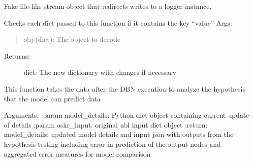 \documentclass[letterpaper,10pt,english]{sphinxmanual}
\begin{document}

\begin{fulllineitems}
\label{\detokenize{index:dbnrisk_wrapper_aske.StreamToLogger}}
Fake file-like stream object that redirects writes to a logger instance.

\end{fulllineitems}


\begin{fulllineitems}
\label{\detokenize{index:dbnrisk_wrapper_aske.as_float}}
Checks each dict passed to this function if it contains the key “value”
Args:
\begin{quote}

obj (dict): The object to decode
\end{quote}
\begin{description}
\item[{Returns:}] \leavevmode
dict: The new dictionary with changes if necessary

\end{description}

\end{fulllineitems}


\begin{fulllineitems}
\label{\detokenize{index:dbnrisk_wrapper_aske.postProcessHypothesis}}
This function takes the data after the DBN execution to analyze the hypothesis that the model can predict data

Arguments:
:param model\_details: Python dict object containing current update of details
:param aske\_input: original ubl input dict object
:return: model\_details: updated model details and input json with outputs from the hypothesis testing including error in prediction of the output nodes and aggregated error measures for model comparison

\end{fulllineitems}

\end{document}
